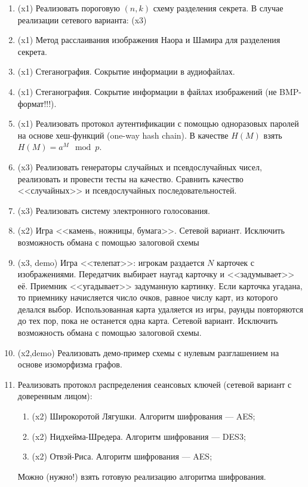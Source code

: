 \documentclass[a4paper]{article}
\begin{document}
\begin{enumerate}
\item (x1) Реализовать пороговую $(n,k)$ схему разделения секрета. В случае реализации сетевого варианта: (x3)

\item (x1) Метод расслаивания изображения Наора и Шамира для разделения секрета.

\item (x1) Стеганография. Сокрытие информации в аудиофайлах.

\item (x1) Стеганография. Сокрытие информации в файлах изображений (не BMP-формат!!!).

\item (x1) Реализовать протокол аутентификации с помощью одноразовых паролей на основе хеш-функций (one-way hash chain). В качестве $H(M)$ взять $H(M)=a^M \mod p$.

\item (x3) Реализовать генераторы случайных и псевдослучайных чисел, реализовать и провести тесты на качество. Сравнить качество <<случайных>> и псевдослучайных последовательностей.

\item (x3) Реализовать систему электронного голосования.

\item (x2) Игра <<камень, ножницы, бумага>>. Сетевой вариант. Исключить возможность обмана с помощью залоговой схемы

\item (x3, demo) Игра <<телепат>>: игрокам раздается $N$ карточек с изображениями. Передатчик выбирает наугад карточку и <<задумывает>> её. Приемник <<угадывает>> задуманную картинку. Если карточка угадана, то приемнику начисляется число очков, равное числу карт, из которого делался выбор. Использованная карта удаляется из игры, раунды повторяются до тех пор, пока не останется одна карта. Сетевой вариант. Исключить возможность обмана с помощью залоговой схемы.

\item (x2,demo) Реализовать демо-пример схемы с нулевым разглашением на основе изоморфизма графов.

\item Реализовать протокол распределения сеансовых ключей (сетевой вариант с доверенным лицом):
\begin{enumerate}
    \item (x2) Широкоротой Лягушки. Алгоритм шифрования --- AES;
    \item (x2) Нидхейма-Шредера.  Алгоритм шифрования --- DES3;
    \item (x2) Отвэй-Риса.  Алгоритм шифрования --- AES;
\end{enumerate}
Можно (нужно!) взять готовую реализацию алгоритма шифрования.


\end{enumerate}
\end{document}
